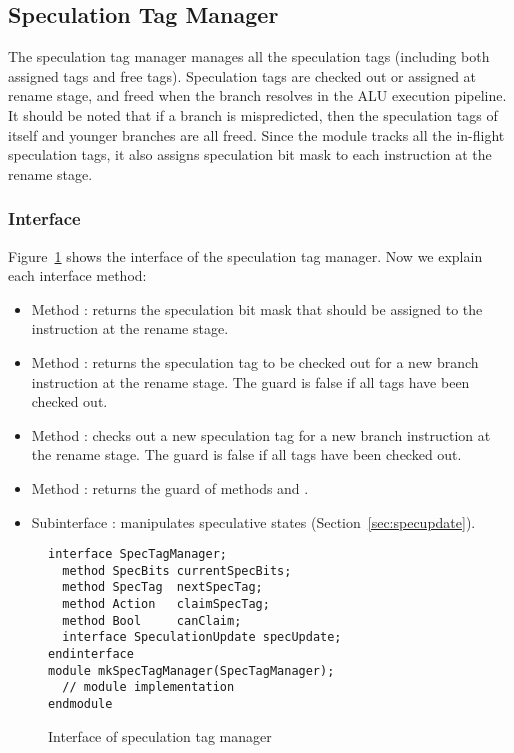 \subsection{Speculation Tag Manager}\label{sec:spectag}

The speculation tag manager manages all the speculation tags (including both assigned tags and free tags).
Speculation tags are checked out or assigned at rename stage, and freed when the branch resolves in the ALU execution pipeline.
It should be noted that if a branch is mispredicted, then the speculation tags of itself and younger branches are all freed.
Since the module tracks all the in-flight speculation tags, it also assigns speculation bit mask to each instruction at the rename stage.

\subsubsection{Interface}

Figure~\ref{fig:spectag-ifc} shows the interface of the speculation tag manager.
Now we explain each interface method:
\begin{itemize}
    \item Method : returns the speculation bit mask that should be assigned to the instruction at the rename stage.
    
    \item Method : returns the speculation tag to be checked out for a new branch instruction at the rename stage.
    The guard is false if all tags have been checked out.
    
    \item Method : checks out a new speculation tag for a new branch instruction at the rename stage.
    The guard is false if all tags have been checked out.
    
    \item Method : returns the guard of methods  and .
    
    \item Subinterface : manipulates speculative states (Section~\ref{sec:specupdate}).
\end{itemize}

\begin{figure}
\begin{lstlisting}[caption={}]
interface SpecTagManager;
  method SpecBits currentSpecBits;
  method SpecTag  nextSpecTag;
  method Action   claimSpecTag;
  method Bool     canClaim;
  interface SpeculationUpdate specUpdate;
endinterface
module mkSpecTagManager(SpecTagManager);
  // module implementation
endmodule
\end{lstlisting}
\caption{Interface of speculation tag manager}\label{fig:spectag-ifc}
\end{figure}

